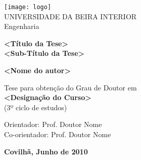 \begin{titlepage}
\begin{center}

\begin{flushleft}
 \texttt{[image: logo]}\\
\rostoubi UNIVERSIDADE DA BEIRA INTERIOR\\
\rostofac Engenharia\\
\end{flushleft}

\vspace{7.6cm}

\rostotitulo \textbf{<Título da Tese>} \\
\rostosubtit \textbf{<Sub-Título da Tese>}\\

\vspace{1.8cm}

\rostonomes \textbf{<Nome do autor>}\\

\vspace{1.4cm}

\rostooutros Tese para obtenção do Grau de Doutor em\\
\rostonomes \textbf{<Designação do Curso>}\\
\rostooutros (3º ciclo de estudos)\\

\vspace{3.3cm}

\rostooutros Orientador: Prof. Doutor Nome\\
Co-orientador: Prof. Doutor Nome\\

\vspace{1.4cm}

\rostooutros \textbf{Covilhã, Junho de 2010}

\end{center}
\end{titlepage}

